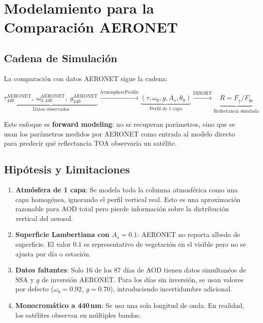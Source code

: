\documentclass[a4paper,11pt]{article}
\begin{document}
\section{Modelamiento para la Comparaci\'on AERONET}
\label{sec:interp_aeronet}

\subsection{Cadena de Simulaci\'on}

La comparaci\'on con datos AERONET sigue la cadena:

\begin{equation*}
    \underbrace{\tau_{440}^{\text{AERONET}},\;
    \omega_{0,440}^{\text{AERONET}},\;
    g_{440}^{\text{AERONET}}}_{\text{Datos observados}}
    \xrightarrow{\text{AtmosphereProfile}}
    \underbrace{(\tau, \omega_0, g, A_s, \theta_0)}_{\text{Perfil de 1 capa}}
    \xrightarrow{\text{DISORT}}
    \underbrace{R = F_\uparrow / F_{\text{in}}}_{\text{Reflectancia simulada}}
\end{equation*}

Este enfoque es \textbf{forward modeling}: no se recuperan par\'ametros, sino que
se usan los par\'ametros medidos por AERONET como entrada al modelo directo para
predecir qu\'e reflectancia TOA observar\'ia un sat\'elite.

\subsection{Hip\'otesis y Limitaciones}

\begin{enumerate}
    \item \textbf{Atm\'osfera de 1 capa}: Se modela toda la columna atmosf\'erica
          como una capa homog\'enea, ignorando el perfil vertical real.  Esto es
          una aproximaci\'on razonable para AOD total pero pierde informaci\'on
          sobre la distribuci\'on vertical del aerosol.

    \item \textbf{Superficie Lambertiana con $A_s = 0.1$}: AERONET no reporta
          albedo de superficie.  El valor $0.1$ es representativo de vegetaci\'on
          en el visible pero no se ajusta por d\'ia o estaci\'on.

    \item \textbf{Datos faltantes}: Solo 16 de los 87 d\'ias de AOD tienen datos
          simultan\'eos de SSA y $g$ de inversi\'on AERONET.  Para los d\'ias sin
          inversi\'on, se usan valores por defecto ($\omega_0 = 0.92$, $g = 0.70$),
          introduciendo incertidumbre adicional.

    \item \textbf{Monocrom\'atico a 440\,nm}: Se usa una sola longitud de onda.
          En realidad, los sat\'elites observan en m\'ultiples bandas.
\end{enumerate}
\end{document}
